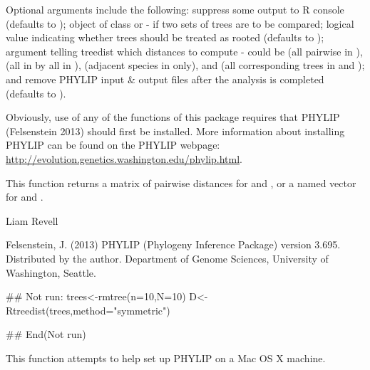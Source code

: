 \documentclass[a4paper]{book}
\begin{document}
%
\begin{Details}\relax
Optional arguments include the following:  suppress some output to R console (defaults to );  object of class  or  - if two sets of trees are to be compared;  logical value indicating whether trees should be treated as rooted (defaults to );  argument telling treedist which distances to compute - could be  (all pairwise in ),  (all in  by all in ),  (adjacent species in  only), and  (all corresponding trees in  and ); and  remove PHYLIP input \& output files after the analysis is completed (defaults to ).

Obviously, use of any of the functions of this package requires that PHYLIP (Felsenstein 2013) should first be installed. More information about installing PHYLIP can be found on the PHYLIP webpage: \url{http://evolution.genetics.washington.edu/phylip.html}.
\end{Details}
%
\begin{Value}
This function returns a matrix of pairwise distances for  and , or a named vector for  and .
\end{Value}
%
\begin{Author}\relax
Liam Revell 
\end{Author}
%
\begin{References}\relax
Felsenstein, J. (2013) PHYLIP (Phylogeny Inference Package) version 3.695. Distributed by the author. Department of Genome Sciences, University of Washington, Seattle.
\end{References}
%
\begin{Examples}
\begin{ExampleCode}
## Not run: 
trees<-rmtree(n=10,N=10)
D<-Rtreedist(trees,method="symmetric")

## End(Not run)
\end{ExampleCode}
\end{Examples}
%
\begin{Description}\relax
This function attempts to help set up PHYLIP on a Mac OS X machine.
\end{Description}
\end{document}
